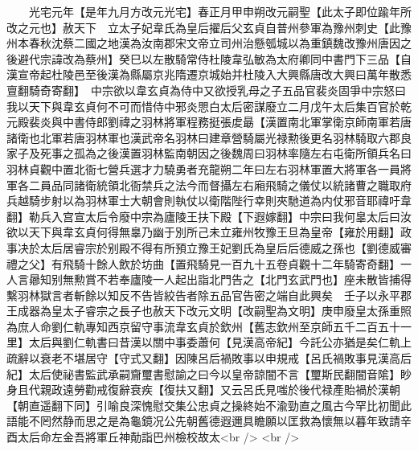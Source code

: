 　　光宅元年【是年九月方改元光宅】春正月甲申朔改元嗣聖【此太子即位踰年所改之元也】赦天下　立太子妃韋氏為皇后擢后父玄貞自普州參軍為豫州刺史【此豫州本春秋沈蔡二國之地漢為汝南郡宋文帝立司州治懸瓠城以為重鎮魏改豫州唐因之後避代宗諱改為蔡州】癸巳以左散騎常侍杜陵韋弘敏為太府卿同中書門下三品【自漢宣帝起杜陵邑至後漢為縣屬京兆隋遷京城始并杜陵入大興縣唐改大興曰萬年散悉亶翻騎奇寄翻】　中宗欲以韋玄貞為侍中又欲授乳母之子五品官裴炎固爭中宗怒曰我以天下與韋玄貞何不可而惜侍中邪炎愳白太后密謀廢立二月戊午太后集百官於乾元殿裴炎與中書侍郎劉禕之羽林將軍程務挺張䖍朂【漢置南北軍掌衛京師南軍若唐諸衛也北軍若唐羽林軍也漢武帝名羽林曰建章營騎屬光禄勲後更名羽林騎取六郡良家子及死事之孤為之後漢置羽林監南朝因之後魏周曰羽林率隨左右屯衛所領兵名曰羽林貞觀中置北衙七營兵選才力驍勇者充龍朔二年曰左右羽林軍置大將軍各一員將軍各二員品同諸衛統領北衙禁兵之法今而督攝左右廂飛騎之儀仗以統諸曹之職取府兵越騎步射以為羽林軍士大朝會則執仗以衛階陛行幸則夾馳道為内仗邪音耶禕吁韋翻】勒兵入宫宣太后令廢中宗為廬陵王扶下殿【下遐嫁翻】中宗曰我何辠太后曰汝欲以天下與韋玄貞何得無辠乃幽于別所己未立雍州牧豫王旦為皇帝【雍於用翻】政事决於太后居睿宗於别殿不得有所預立豫王妃劉氏為皇后后德威之孫也【劉德威審禮之父】有飛騎十餘人飲於坊曲【置飛騎見一百九十五卷貞觀十二年騎寄奇翻】一人言曏知别無勲賞不若奉廬陵一人起出詣北門告之【北門玄武門也】座未散皆捕得繫羽林獄言者斬餘以知反不告皆絞告者除五品官告密之端自此興矣　壬子以永平郡王成器為皇太子睿宗之長子也赦天下改元文明【改嗣聖為文明】庚申廢皇太孫重照為庶人命劉仁軌專知西京留守事流韋玄貞於欽州【舊志欽州至京師五千二百五十一里】太后與劉仁軌書曰昔漢以關中事委蕭何【見漢高帝紀】今託公亦猶是矣仁軌上疏辭以衰老不堪居守【守式又翻】因陳呂后禍敗事以申規戒【呂氏禍敗事見漢高后紀】太后使祕書監武承嗣齎璽書慰諭之曰今以皇帝諒闇不言【璽斯民翻闇音隂】眇身且代親政遠勞勸戒復辭衰疾【復扶又翻】又云呂氏見嗤於後代禄產貽禍於漢朝【朝直遥翻下同】引喻良深愧慰交集公忠貞之操終始不渝勁直之風古今罕比初聞此語能不罔然静而思之是為龜鏡况公先朝舊德遐邇具瞻願以匡救為懷無以暮年致請辛酉太后命左金吾將軍丘神勣詣巴州檢校故太<br />
<br />
